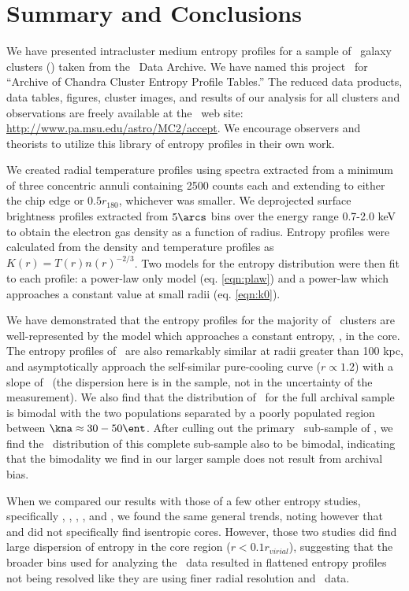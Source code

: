 \section{Summary and Conclusions}
\label{sec:entsuppsummary}

We have presented intracluster medium entropy profiles for a sample of
\entsuppnum\ galaxy clusters (\expt) taken from the \chandra\ Data
Archive. We have named this project \accept\ for ``Archive of Chandra
Cluster Entropy Profile Tables.'' The reduced data products, data
tables, figures, cluster images, and results of our analysis for all
clusters and observations are freely available at the \accept\ web
site: \url{http://www.pa.msu.edu/astro/MC2/accept}. We encourage
observers and theorists to utilize this library of entropy profiles in
their own work.

We created radial temperature profiles using spectra extracted from a
minimum of three concentric annuli containing 2500 counts each and
extending to either the chip edge or $0.5 r_{180}$, whichever was
smaller. We deprojected surface brightness profiles extracted from
$5\arcs$ bins over the energy range 0.7-2.0 keV to obtain the electron
gas density as a function of radius. Entropy profiles were calculated
from the density and temperature profiles as $K(r) =
T(r)n(r)^{-2/3}$. Two models for the entropy distribution were then
fit to each profile: a power-law only model (eq. \ref{eqn:plaw}) and
a power-law which approaches a constant value at small radii
(eq. \ref{eqn:k0}).

We have demonstrated that the entropy profiles for the majority of
\accept\ clusters are well-represented by the model which approaches a
constant entropy, \kna, in the core. The entropy profiles of
\accept\ are also remarkably similar at radii greater than 100 kpc,
and asymptotically approach the self-similar pure-cooling curve ($r
\propto 1.2$) with a slope of \alphafs\ (the dispersion here is in the
sample, not in the uncertainty of the measurement). We also find that
the distribution of \kna\ for the full archival sample is bimodal with
the two populations separated by a poorly populated region between
$\kna \approx 30-50 \ent$. After culling out the primary
\hifl\ sub-sample of \citet{hiflugcs1}, we find the \kna\ distribution
of this complete sub-sample also to be bimodal, indicating that the
bimodality we find in our larger sample does not result from archival
bias.

When we compared our results with those of a few other entropy
studies, specifically \citet{davies00}, \citet{ponman03},
\citet{piffaretti05}, \citet{pratt06}, and \citet{morandi07}, we found
the same general trends, noting however that \citet{piffaretti05} and
\citet{pratt06} did not specifically find isentropic cores. However,
those two studies did find large dispersion of entropy in the core
region ($r < 0.1 r_{virial}$), suggesting that the broader bins used
for analyzing the \xmm\ data resulted in flattened entropy profiles
not being resolved like they are using finer radial resolution and
\chandra\ data.

